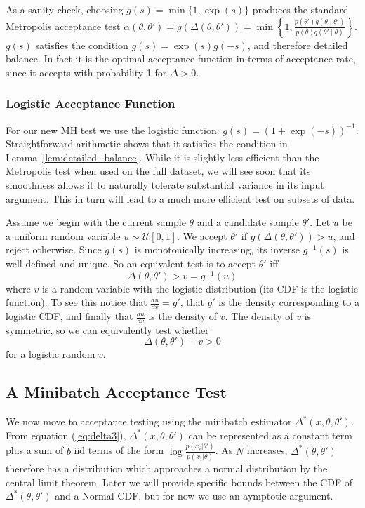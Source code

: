 \documentclass{article}
\begin{document}
As a sanity check, choosing $g(s) = \min\{1, \exp(s) \}$ produces the
standard Metropolis acceptance test $\alpha(\theta,\theta') = g(\Delta(\theta,\theta')) = 
\min\left\{1, \frac{p(\theta')q(\theta \mid
  \theta')}{p(\theta)q(\theta' \mid \theta)}\right\}$. $g(s)$ satisfies
the condition $g(s) = \exp(s)g(-s)$, and therefore detailed
balance. In fact it is the optimal acceptance function in terms of
acceptance rate, since it accepts with probability 1 for $\Delta > 0$.

\subsubsection{Logistic Acceptance Function}\label{ssec:deltas_full}
For our new MH test we use the logistic function: $g(s) =
(1+\exp(-s))^{-1}$. Straightforward arithmetic shows that it satisfies the condition in
Lemma~\ref{lem:detailed_balance}.  While it is slightly less efficient than the Metropolis
test when used on the full dataset, we will see soon that its smoothness allows it to naturally
tolerate substantial variance in its input argument. This in turn will lead to a much more efficient
test on subsets of data.

Assume we begin with the current sample $\theta$  and a
candidate sample $\theta'$. Let $u$ be a uniform random variable $u \sim
\mathcal{U}[0,1]$. We accept $\theta'$ if $g(\Delta(\theta,\theta')) > u$, and reject otherwise.
Since $g(s)$ is monotonically increasing, its inverse $g^{-1}(s)$ is well-defined and
unique. So an equivalent test is to accept $\theta'$ iff
\begin{equation}
  \Delta(\theta,\theta') > v = g^{-1}(u)
\end{equation}
where $v$ is a random variable with the logistic distribution (its CDF is the logistic function). To
see this notice that $\frac{du}{dv} = g'$, that $g'$ is the density corresponding to a logistic
CDF, and finally that $\frac{du}{dv}$ is the density of $v$. The density of $v$ is symmetric,
so we can equivalently test whether
\begin{equation}
  \Delta(\theta,\theta') + v > 0
\end{equation}
for a logistic random $v$. 


\subsection{A Minibatch Acceptance Test}\label{ssec:deltas_minibatch}

We now move to acceptance testing using the minibatch estimator
$\Delta^*(x,\theta,\theta')$. From equation (\ref{eq:delta3}),
$\Delta^*(x,\theta,\theta')$ can be represented as a constant term
plus a sum of $b$ iid terms of the form
$\log\frac{p(x_i|\theta')}{p(x_i|\theta)}$. As $N$ increases, $\Delta^*(\theta,\theta')$
therefore has a distribution which approaches a normal distribution by the central limit
theorem. Later we will provide specific bounds between the CDF of $\Delta^*(\theta,\theta')$
and a Normal CDF, but for now we use an aymptotic argument. 
\end{document}
